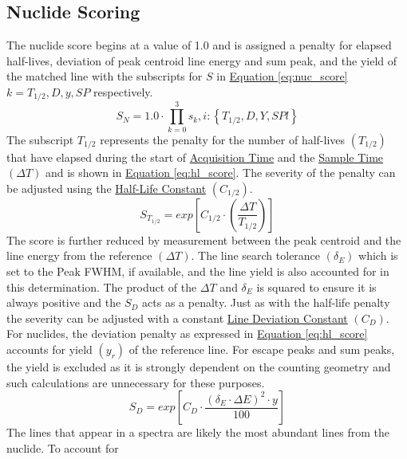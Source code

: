 \documentclass[12pt,report,justified]{SANDreport}
\begin{document}
        \subsection{Nuclide Scoring} \label{sec:nuc_score}
The nuclide score begins at a value of 1.0 and is assigned a penalty for elapsed half-lives, deviation
of peak centroid line energy and sum peak, and the yield of the matched line with the subscripts
for \(S\) in \hyperref[eq:nuc_score]{Equation \ref{eq:nuc_score}} \(k = T_{1/2},D, y, SP\) respectively.
\begin{equation}
    S_N = 1.0 \cdot \prod_{k=0}^{3} s_k, i: \left\{T_{1/2},D,Y,SPl\right\}
    \label{eq:nuc_score}
\end{equation}
The subscript \(T_{1/2}\) represents the penalty for the number of half-lives \(\left(T_{1/2}\right)\) that have elapsed
during the start of \hyperref[itm:time_acq]{Acquisition Time} and the \hyperref[itm:time_smp]{Sample Time} 
\(\left( \Delta T\right)\) and is shown in \hyperref[eq:hl_score]{Equation \ref{eq:hl_score}}. The severity of the 
penalty can be adjusted using the \hyperref[itm:hl_const]{Half-Life Constant} \(\left(C_{1/2}\right) \).
\begin{equation}
S_{T_{1/2}} = exp \left[ C_{1/2} \cdot \left( \frac{\Delta T}{T_{1/2}} \right) \right]
\label{eq:hl_score}
\end{equation}
The score is further reduced by measurement between the peak centroid and the line energy from
the reference \(\left( \Delta T\right)\). The line search tolerance  \(\left( \delta _E\right)\) which is set to 
the Peak FWHM, if available, and the line yield is also accounted for in this determination. The 
product of the  \(\Delta T\) and \( \delta _E\) is squared to ensure it is always positive and the \(S_D\) 
acts as a penalty. Just as with the half-life penalty the severity can be adjusted with a constant 
\hyperref[itm:ln_dev_const]{Line Deviation Constant} \(\left(C_D \right)\). For nuclides, the deviation penalty 
as expressed in \hyperref[eq:hl_score]{Equation \ref{eq:hl_score}} accounts for yield  \(\left( y_r \right)\) of
 the reference line. For escape peaks and sum peaks, the yield is excluded as it is strongly dependent on 
the counting geometry and such calculations are unnecessary for these purposes.
\begin{equation}
S_D = exp \left[ C_D \cdot \frac{\left(\delta_E \cdot \Delta E \right)^2 \cdot y}{100} \right]
\label{eq:dev_score}
\end{equation}
The lines that appear in a spectra are likely the most abundant lines from the nuclide. To account for
\end{document}
